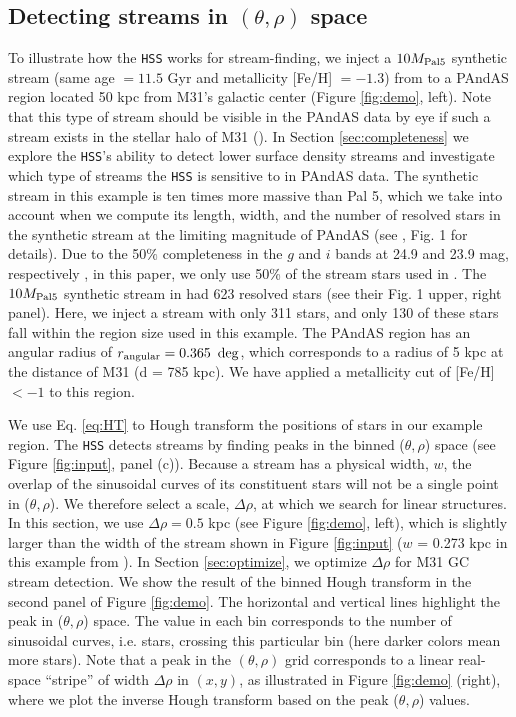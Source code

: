 \documentclass[twocolumn]{aastex631}
\begin{document}
\subsection{Detecting streams in $(\theta,\rho)$ space}\label{sec:grid}
To illustrate how the \texttt{HSS} works for stream-finding, we inject a $10{M}_{\rm Pal 5}$ synthetic stream (same age $= 11.5$ Gyr and metallicity [Fe/H] $= -1.3$) from  to a PAndAS region located 50 kpc from M31's galactic center (Figure \ref{fig:demo}, left). Note that this type of stream should be visible in the PAndAS data by eye if such a stream exists in the stellar halo of M31 (). In Section \ref{sec:completeness} we explore the \texttt{HSS}'s ability to detect lower surface density streams and investigate which type of streams the \texttt{HSS} is sensitive to in PAndAS data.
The synthetic stream in this example is ten times more massive than Pal 5, which we take into account when we compute its length, width, and the number of resolved stars in the synthetic stream at the limiting magnitude of PAndAS (see , Fig. 1 for details). Due to the 50$\%$ completeness in the $g$ and $i$ bands at  24.9 and 23.9 mag, respectively \citep[see Fig. 4 in][]{martin16}, in this paper, we only use 50\% of the stream stars used in . The $10{M}_{\rm Pal 5}$ synthetic stream in  had 623 resolved stars (see their Fig. 1 upper, right panel). Here, we inject a stream with only 311 stars, and only 130 of these stars fall within the region size used in this example. 
The PAndAS region has an angular radius of  $ r_{\rm angular} = 0.365~ \deg$, which corresponds to a radius of 5 kpc at the distance of M31 (d = 785 kpc). We have applied a metallicity cut of [Fe/H] $< -1$ to this region. 



We use Eq. \ref{eq:HT} to Hough transform the positions of stars in our example region. 
The \texttt{HSS} detects streams by finding peaks in the binned ($\theta,\rho$) space (see Figure \ref{fig:input}, panel (c)). Because a stream has a physical width, $w$, the overlap of the sinusoidal curves of its constituent stars will not be a single point in ($\theta,\rho$). We therefore select a scale, $\Delta \rho$, at which we search for linear structures. In this section, we use $\Delta \rho = 0.5$ kpc (see Figure \ref{fig:demo}, left), which is slightly larger than the width of the stream shown in Figure \ref{fig:input} ($w$ = 0.273 kpc in this example from ). In Section \ref{sec:optimize}, we optimize $\Delta \rho$ for M31 GC stream detection. We show the result of the binned Hough transform in the second panel of Figure \ref{fig:demo}. 
The horizontal and vertical lines highlight the peak in ($\theta,\rho$) space. The value in each bin corresponds to the number of sinusoidal curves, i.e. stars, crossing this particular bin (here darker colors mean more stars). Note that a peak in the $(\theta,\rho)$ grid corresponds to a linear real-space ``stripe'' of width $\Delta \rho$ in $(x, y)$, as illustrated in Figure \ref{fig:demo} (right), where we plot the inverse Hough transform based on the peak ($\theta,\rho$) values. 
\end{document}
